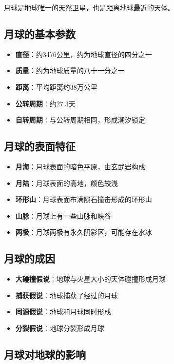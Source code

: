 \documentclass[12pt,UTF8]{ctexbook}
\begin{document}
月球是地球唯一的天然卫星，也是距离地球最近的天体。

\subsection{月球的基本参数}

\begin{itemize}
  \item \textbf{直径}：约3476公里，约为地球直径的四分之一
  \item \textbf{质量}：约为地球质量的八十一分之一
  \item \textbf{距离}：平均距离约38万公里
  \item \textbf{公转周期}：约27.3天
  \item \textbf{自转周期}：与公转周期相同，形成潮汐锁定
\end{itemize}

\subsection{月球的表面特征}

\begin{itemize}
  \item \textbf{月海}：月球表面的暗色平原，由玄武岩构成
  \item \textbf{月陆}：月球表面的高地，颜色较浅
  \item \textbf{环形山}：月球表面布满陨石撞击形成的环形山
  \item \textbf{山脉}：月球上有一些山脉和峡谷
  \item \textbf{两极}：月球两极有永久阴影区，可能存在水冰
\end{itemize}

\subsection{月球的成因}

\begin{itemize}
  \item \textbf{大碰撞假说}：地球与火星大小的天体碰撞形成月球
  \item \textbf{捕获假说}：地球捕获了经过的月球
  \item \textbf{同源假说}：地球和月球同时形成
  \item \textbf{分裂假说}：地球分裂形成月球
\end{itemize}

\subsection{月球对地球的影响}
\end{document}

